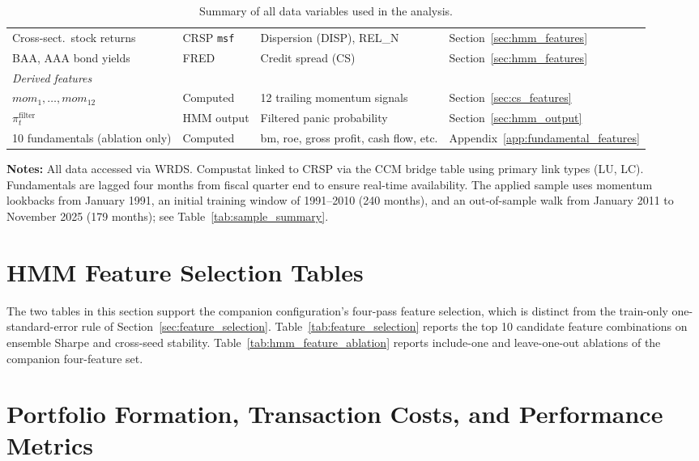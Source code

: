 \begin{table}[H]
{\begin{tabular}{l l l l}
Cross-sect.\ stock returns & CRSP \texttt{msf} & Dispersion (DISP), REL\_N & Section~\ref{sec:hmm_features} \\
BAA, AAA bond yields & FRED & Credit spread (CS) & Section~\ref{sec:hmm_features} \\
\midrule
\multicolumn{4}{l}{\emph{Derived features}} \\
$mom_1, \dots, mom_{12}$ & Computed & 12 trailing momentum signals & Section~\ref{sec:cs_features} \\
$\pi_t^{\text{filter}}$ & HMM output & Filtered panic probability & Section~\ref{sec:hmm_output} \\
10 fundamentals (ablation only) & Computed & bm, roe, gross profit, cash flow, etc. & Appendix~\ref{app:fundamental_features} \\
\bottomrule
\end{tabular}%
}
\caption{Summary of all data variables used in the analysis.}
\label{tab:data_summary}

\medskip
\small
\textbf{Notes:} All data accessed via WRDS. Compustat linked to CRSP via the CCM bridge table using primary link types (LU, LC). Fundamentals are lagged four months from fiscal quarter end to ensure real-time availability. The applied sample uses momentum lookbacks from January 1991, an initial training window of 1991--2010 (240 months), and an out-of-sample walk from January 2011 to November 2025 (179 months); see Table~\ref{tab:sample_summary}.
\end{table}

\section{HMM Feature Selection Tables}\label{app:hmm_feature_tables}

The two tables in this section support the companion configuration's four-pass feature selection, which is distinct from the train-only one-standard-error rule of Section~\ref{sec:feature_selection}. Table~\ref{tab:feature_selection} reports the top 10 candidate feature combinations on ensemble Sharpe and cross-seed stability. Table~\ref{tab:hmm_feature_ablation} reports include-one and leave-one-out ablations of the companion four-feature set.





\section{Portfolio Formation, Transaction Costs, and Performance Metrics}\label{app:portfolio}

